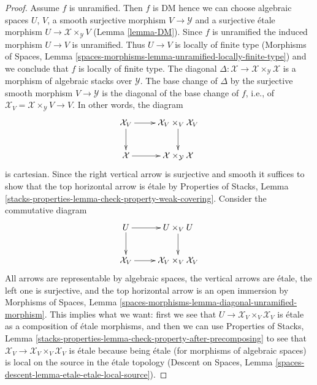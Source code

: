 \documentclass[10pt,a4paper]{amsart}
\theoremstyle{plain}
\theoremstyle{definition}
\theoremstyle{remark}
\numberwithin{equation}{subsection}
\begin{document}
\begin{proof}
Assume $f$ is unramified. Then $f$ is DM hence we can choose
algebraic spaces $U$, $V$, a smooth surjective morphism
$V \to \mathcal{Y}$ and a surjective \'etale morphism
$U \to \mathcal{X} \times_\mathcal{Y} V$ (Lemma \ref{lemma-DM}).
Since $f$ is unramified the induced morphism $U \to V$ is unramified.
Thus $U \to V$ is locally of finite type
(Morphisms of Spaces, Lemma
\ref{spaces-morphisms-lemma-unramified-locally-finite-type})
and we conclude that $f$ is locally of finite type. The diagonal
$\Delta : \mathcal{X} \to \mathcal{X} \times_\mathcal{Y} \mathcal{X}$
is a morphism of algebraic stacks over $\mathcal{Y}$.
The base change of $\Delta$ by the surjective smooth morphism
$V \to \mathcal{Y}$ is the diagonal of the base change of
$f$, i.e., of $\mathcal{X}_V = \mathcal{X} \times_\mathcal{Y} V \to V$.
In other words, the diagram
$$
\xymatrix{
\mathcal{X}_V \ar[r] \ar[d] &  \mathcal{X}_V \times_V \mathcal{X}_V \ar[d] \\
\mathcal{X} \ar[r] & \mathcal{X} \times_\mathcal{Y} \mathcal{X}
}
$$
is cartesian. Since the right vertical arrow is surjective and smooth
it suffices to show that the top horizontal arrow is \'etale by
Properties of Stacks, Lemma
\ref{stacks-properties-lemma-check-property-weak-covering}.
Consider the commutative diagram
$$
\xymatrix{
U \ar[d] \ar[r] & U \times_V U \ar[d] \\
\mathcal{X}_V \ar[r] & \mathcal{X}_V \times_V \mathcal{X}_V
}
$$
All arrows are representable by algebraic spaces,
the vertical arrows are \'etale, the left one is surjective, and
the top horizontal arrow is an open immersion by
Morphisms of Spaces, Lemma
\ref{spaces-morphisms-lemma-diagonal-unramified-morphism}.
This implies what we want: first we see that
$U \to \mathcal{X}_V \times_V \mathcal{X}_V$ is \'etale
as a composition of \'etale morphisms, and then we can use
Properties of Stacks, Lemma
\ref{stacks-properties-lemma-check-property-after-precomposing}
to see that $\mathcal{X}_V \to \mathcal{X}_V \times_V \mathcal{X}_V$
is \'etale because being \'etale (for morphisms of algebraic spaces)
is local on the source in the \'etale topology
(Descent on Spaces, Lemma \ref{spaces-descent-lemma-etale-etale-local-source}).


\end{proof}
\end{document}
